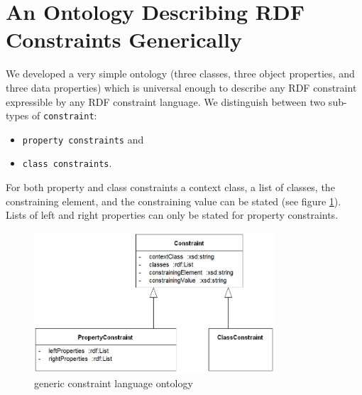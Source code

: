 \documentclass{llncs}
\newcommand{\ms}[1]{\texttt{#1}}
\begin{document}
\section{An Ontology Describing RDF Constraints Generically} 
\label{sec:ontology}

We developed a very simple ontology (three classes, three object properties, and three data properties) which is universal enough to describe any RDF constraint expressible by any RDF constraint language.
We distinguish between two sub-types of \ms{constraint}: 
\begin{itemize}
	\item \ms{property constraints} and 
	\item \ms{class constraints}. 
\end{itemize}

For both property and class constraints a context class, a list of classes, the constraining element, and the constraining value can be stated
(see figure \ref{fig:generic-constraint-language-ontology}). Lists of left and right properties can only be stated for property constraints.

\begin{figure}
	\centering
		\includegraphics[width=0.80\textwidth]{images/generic-constraint-language-ontology.png}
	\caption{generic constraint language ontology}
	\label{fig:generic-constraint-language-ontology}
\end{figure}
\end{document}
